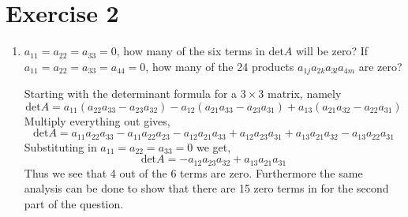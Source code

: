 \section{Exercise 2}
\begin{enumerate}[label=\arabic*.]
    \item $a_{11} = a_{22} = a_{33} =0 $, how many of the six terms in
        $\text{det} A$ will be zero? If $a_{11} = a_{22} = a_{33} = a_{44}
        = 0 $, how many of the 24 products $a_{1j}a_{2k}a_{3l}a_{4m}$ are
        zero?
        \begin{mdframed}[style=MyFrame]
            Starting with the determinant formula for a $3 \times 3$
            matrix, namely
            \begin{equation}
                \text{det}A =
                    a_{11}(a_{22}a_{33} - a_{23}a_{32})
                    -a_{12}(a_{21} a_{33} - a_{23}a_{31})
                    + a_{13}(a_{21}a_{32} -a_{22}a_{31})
            \end{equation}
            Multiply everything out gives,
            \begin{equation}
                \text{det}A = 
                    a_{11}a_{22}a_{33} 
                    -a_{11}a_{22}a_{23}  
                    -a_{12}a_{21}a_{33}  
                    +a_{12}a_{23}a_{31}  
                    +a_{13}a_{21}a_{32}  
                    -a_{13}a_{22}a_{31}  
            \end{equation}
            Substituting in $a_{11} = a_{22} = a_{33} =0 $ we get,
            \begin{equation}
                \text{det}A = 
                    -a_{12}a_{23}a_{32} + a_{13}a_{21}a_{31}
            \end{equation}
            Thus we see that 4 out of the 6 terms are zero. Furthermore the
            same analysis can be done to show that there are 15 zero terms
            in for the second part of the question. 
        \end{mdframed}



\end{enumerate}
